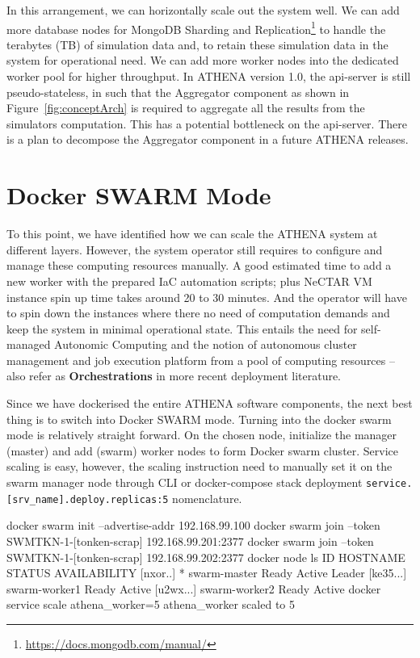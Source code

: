 In this arrangement, we can horizontally scale out the system well. We can add more database nodes for MongoDB Sharding and Replication\footnote{\url{https://docs.mongodb.com/manual/}} to handle the terabytes (TB) of simulation data and, to retain these simulation data in the system for operational need. We can add more worker nodes into the dedicated worker pool for higher throughput. In ATHENA version 1.0, the api-server is still pseudo-stateless, in such that the Aggregator component as shown in Figure~\ref{fig:conceptArch} is required to aggregate all the results from the simulators computation. This has a potential bottleneck on the api-server. There is a plan to decompose the Aggregator component in a future ATHENA releases.

\section{Docker SWARM Mode}

To this point, we have identified how we can scale the ATHENA system at different layers. However, the system operator still requires to configure and manage these computing resources manually. A good estimated time to add a new worker with the prepared IaC automation scripts; plus NeCTAR VM instance spin up time takes around 20 to 30 minutes. And the operator will have to spin down the instances where there no need of computation demands and keep the system in minimal operational state. This entails the need for self-managed Autonomic Computing \parencite{1160055} and the notion of autonomous cluster management and job execution platform from a pool of computing resources -- also refer as \textbf{Orchestrations} in more recent deployment literature.

Since we have dockerised the entire ATHENA software components, the next best thing is to switch into Docker SWARM mode. Turning into the docker swarm mode is relatively straight forward. On the chosen node, initialize the manager (master) and add (swarm) worker nodes to form Docker swarm cluster. Service scaling is easy, however, the scaling instruction need to manually set it on the swarm manager node through CLI or docker-compose stack deployment \verb|service.[srv_name].deploy.replicas:5| nomenclature.
\begin{small}
\begin{lcverbatim}
docker swarm init --advertise-addr 192.168.99.100
docker swarm join --token SWMTKN-1-[tonken-scrap] 192.168.99.201:2377
docker swarm join --token SWMTKN-1-[tonken-scrap] 192.168.99.202:2377
docker node ls
ID                            HOSTNAME         STATUS          AVAILABILITY
[nxor..] *   swarm-master        Ready          Active          Leader
[ke35...]    swarm-worker1       Ready          Active
[u2wx...]    swarm-worker2       Ready          Active
docker service scale athena_worker=5
athena_worker scaled to 5
\end{lcverbatim}
\end{small}

